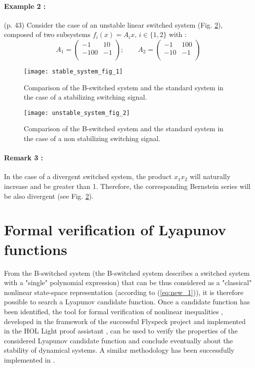 \documentclass[12pt]{article}
\begin{document}
\paragraph{Example 2 :} (p. 43) Consider the case of an unstable linear switched system (Fig. \ref{fig:unstable_sys}), composed of two subsystems 
$f_i(x) = A_i x, \, i \in \{1, 2\}$ with :
\begin{equation}
 A_1 = \left( \begin{array}{cc}
 -1 & 10 \\
 -100 & -1 \\
 \end{array} \right); \qquad
  A_2 = \left( \begin{array}{cc}
 -1 & 100 \\
 -10 & -1\\
 \end{array} \right)
\end{equation}
\begin{figure}[!h]
\centering
\texttt{[image: stable\_system\_fig\_1]}
\caption{Comparison of the B-switched system and the standard system in the case of a stabilizing switching signal.}
\label{fig:stable_sys}
\end{figure}
\begin{figure}[!h]
\centering
\texttt{[image: unstable\_system\_fig\_2]}
\caption{Comparison of the B-switched system and the standard system in the case of a non stabilizing switching signal.}
\label{fig:unstable_sys}
\end{figure}
\paragraph{Remark 3 :} In the case of a divergent switched system, the product $x_1 x_2$ will naturally increase and be greater than 1. Therefore, the corresponding Bernstein series 
will be also divergent (see Fig. \ref{fig:unstable_sys}).

\newpage
\section{Formal verification of Lyapunov functions}
From the B-switched system (the B-switched system describes a switched system with a "single" polynomial expression) that can be thus considered as a "classical" nonlinear state-space representation
(according to (\ref{eq:new_1})), it is therefore possible to search a Lyapunov candidate function. Once a candidate function has been identified, the tool 
for formal verification of nonlinear inequalities \cite{solo}, developed in the framework of the successful Flyspeck project \cite{flys} and implemented in the HOL Light proof assistant 
\cite{hol}, can be used to verify the properties of the considered Lyapunov candidate function and conclude eventually about the stability of dynamical systems. A similar methodology has been successfully
implemented in \cite{Why}.
\end{document}
